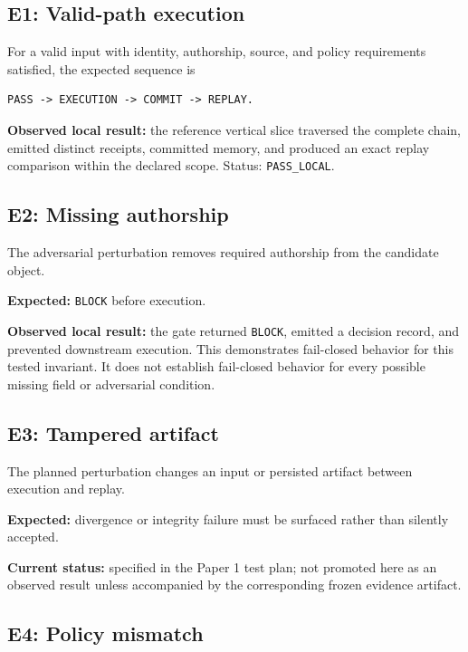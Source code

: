 \documentclass[11pt]{article}
\begin{document}
\subsection{E1: Valid-path execution}

For a valid input with identity, authorship, source, and policy requirements satisfied, the expected sequence is

\begin{verbatim}
PASS -> EXECUTION -> COMMIT -> REPLAY.
\end{verbatim}

\textbf{Observed local result:} the reference vertical slice traversed the complete chain, emitted distinct receipts, committed memory, and produced an exact replay comparison within the declared scope. Status: \texttt{PASS\_LOCAL}.

\subsection{E2: Missing authorship}

The adversarial perturbation removes required authorship from the candidate object.

\textbf{Expected:} \texttt{BLOCK} before execution.

\textbf{Observed local result:} the gate returned \texttt{BLOCK}, emitted a decision record, and prevented downstream execution. This demonstrates fail-closed behavior for this tested invariant. It does not establish fail-closed behavior for every possible missing field or adversarial condition.

\subsection{E3: Tampered artifact}

The planned perturbation changes an input or persisted artifact between execution and replay.

\textbf{Expected:} divergence or integrity failure must be surfaced rather than silently accepted.

\textbf{Current status:} specified in the Paper 1 test plan; not promoted here as an observed result unless accompanied by the corresponding frozen evidence artifact.

\subsection{E4: Policy mismatch}
\end{document}
